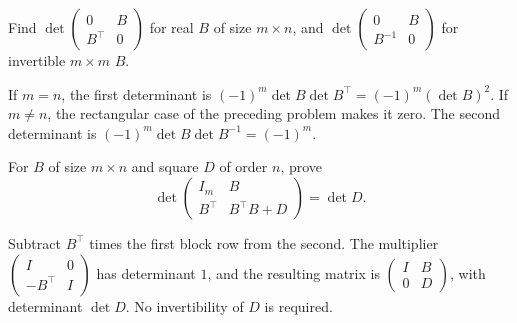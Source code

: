 \begin{problem}\label{ex:07:block-transpose}
Find \(\det\begin{pmatrix}0&B\\B^\top&0\end{pmatrix}\) for real
\(B\) of size \(m\times n\), and
\(\det\begin{pmatrix}0&B\\B^{-1}&0\end{pmatrix}\) for invertible
\(m\times m\) \(B\).
\end{problem}
\begin{solution}
If \(m=n\), the first determinant is
\((-1)^m\det B\det B^\top=(-1)^m(\det B)^2\).
If \(m\ne n\), the rectangular case of the preceding problem makes it
zero. The second determinant is
\((-1)^m\det B\det B^{-1}=(-1)^m\).
\end{solution}

\begin{problem}\label{ex:07:block-gram}
For \(B\) of size \(m\times n\) and square \(D\) of order \(n\), prove
\[
 \det\begin{pmatrix}I_m&B\\B^\top&B^\top B+D\end{pmatrix}=\det D.
\]
\end{problem}
\begin{solution}
Subtract \(B^\top\) times the first block row from the second.
The multiplier \(\begin{pmatrix}I&0\\-B^\top&I\end{pmatrix}\) has
determinant \(1\), and the resulting matrix is
\(\begin{pmatrix}I&B\\0&D\end{pmatrix}\), with determinant \(\det D\).
No invertibility of \(D\) is required.
\end{solution}

